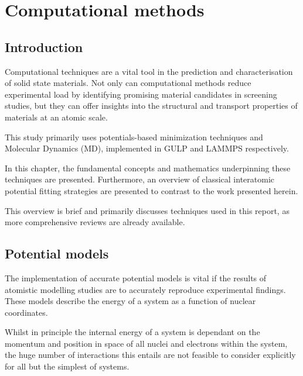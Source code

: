 \chapter{Computational methods}
\section{Introduction} %
Computational techniques are a vital tool in the prediction and characterisation of solid state materials.
Not only can computational methods reduce experimental load by identifying promising material candidates in screening studies, but they can offer insights into the structural and transport properties of materials at an atomic scale.

This study primarily uses potentials-based minimization techniques and Molecular Dynamics (MD), implemented in GULP \cite{Gale2003} and LAMMPS \cite{StevePlimton1995} respectively.

In this chapter, the fundamental concepts and mathematics underpinning these techniques are presented.
Furthermore, an overview of classical interatomic potential fitting strategies are presented to contrast to the work presented herein. %

This overview is brief and primarily discusses techniques used in this report, as more comprehensive reviews are already available. \cite{Gale2003,Jensen2007,Catlow2013}



\section{Potential models}
The implementation of accurate potential models is vital if the results of atomistic modelling studies are to accurately reproduce experimental findings.
These models describe the energy of a system as a function of nuclear coordinates.

Whilst in principle the internal energy of a system is dependant on the momentum and position in space of all nuclei and electrons within the system, the huge number of interactions this entails are not feasible to consider explicitly for all but the simplest of systems.

